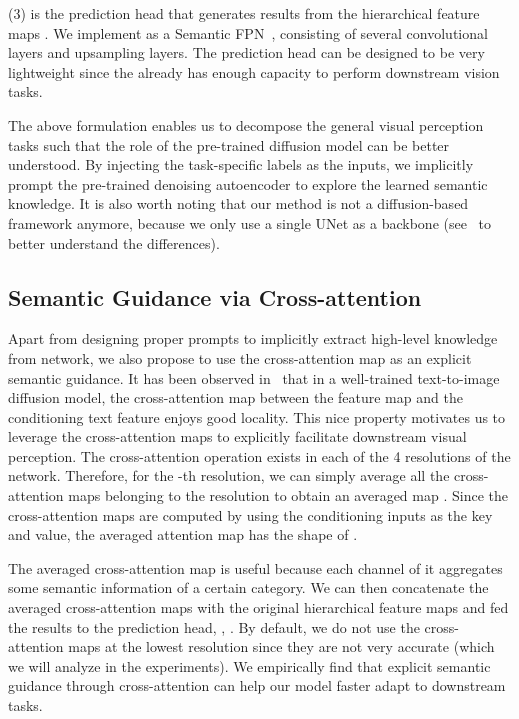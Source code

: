 \documentclass[10pt,twocolumn,letterpaper]{article}
\newcommand{\epstheta}{}
\begin{document}
\noindent(3) \underline{} is the prediction head that generates results from the hierarchical feature maps . We implement  as a Semantic FPN~\cite{kirillov2019semanticfpn}, consisting of several convolutional layers and upsampling layers. The prediction head can be designed to be very lightweight since the  already has enough capacity to perform downstream vision tasks.

The above formulation enables us to decompose the general visual perception tasks such that the role of the pre-trained diffusion model can be better understood. By injecting the task-specific labels  as the inputs, we implicitly prompt the pre-trained denoising autoencoder to explore the learned semantic knowledge. It is also worth noting that our method is not a diffusion-based framework anymore, because we only use a single UNet as a backbone (see~ to better understand the differences). 

\subsection{Semantic Guidance via Cross-attention}


Apart from designing proper prompts to implicitly extract high-level knowledge from  network, we also propose to use the cross-attention map as an explicit semantic guidance. It has been observed in~\cite{hertz2022prompt} that in a well-trained text-to-image diffusion model, the cross-attention map between the feature map and the conditioning text feature enjoys good locality. This nice property motivates us to leverage the cross-attention maps to explicitly facilitate downstream visual perception. The cross-attention operation exists in each of the 4 resolutions of the \epstheta{} network. Therefore, for the -th resolution, we can simply average all the cross-attention maps belonging to the resolution to obtain an averaged map . Since the cross-attention maps are computed by using the conditioning inputs  as the key and value, the averaged attention map has the shape of . 

The averaged cross-attention map is useful because each channel of it aggregates some semantic information of a certain category. We can then concatenate the averaged cross-attention maps with the original hierarchical feature maps and fed the results to the prediction head, \ie, . By default, we do not use the cross-attention maps at the lowest resolution since they are not very accurate (which we will analyze in the experiments). We empirically find that explicit semantic guidance through cross-attention can help our model faster adapt to downstream tasks. 
\end{document}
